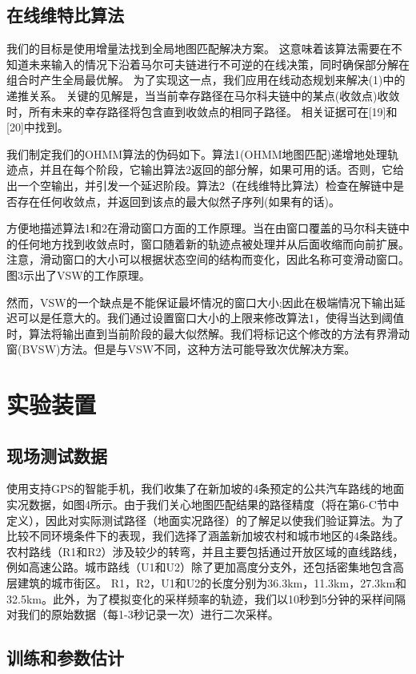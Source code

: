 \subsection{在线维特比算法}
我们的目标是使用增量法找到全局地图匹配解决方案。 这意味着该算法需要在不知道未来输入的情况下沿着马尔可夫链进行不可逆的在线决策，同时确保部分解在组合时产生全局最优解。 为了实现这一点，我们应用在线动态规划来解决(1)中的递推关系。 关键的见解是，当当前幸存路径在马尔科夫链中的某点(收敛点)收敛时，所有未来的幸存路径将包含直到收敛点的相同子路径。 相关证据可在[19]和[20]中找到。

我们制定我们的OHMM算法的伪码如下。算法1(OHMM地图匹配)递增地处理轨迹点，并且在每个阶段，它输出算法2返回的部分解，如果可用的话。否则，它给出一个空输出，并引发一个延迟阶段。算法2（在线维特比算法）检查在解链中是否存在任何收敛点，并返回到该点的最大似然子序列(如果有的话)。

方便地描述算法1和2在滑动窗口方面的工作原理。当在由窗口覆盖的马尔科夫链中的任何地方找到收敛点时，窗口随着新的轨迹点被处理并从后面收缩而向前扩展。注意，滑动窗口的大小可以根据状态空间的结构而变化，因此名称可变滑动窗口。图3示出了VSW的工作原理。

然而，VSW的一个缺点是不能保证最坏情况的窗口大小;因此在极端情况下输出延迟可以是任意大的。我们通过设置窗口大小的上限来修改算法1，使得当达到阈值时，算法将输出直到当前阶段的最大似然解。我们将标记这个修改的方法有界滑动窗(BVSW)方法。但是与VSW不同，这种方法可能导致次优解决方案。

\section{实验装置}

\subsection{现场测试数据}
使用支持GPS的智能手机，我们收集了在新加坡的4条预定的公共汽车路线的地面实况数据，如图4所示。由于我们关心地图匹配结果的路径精度（将在第6-C节中定义），因此对实际测试路径（地面实况路径）的了解足以使我们验证算法。为了比较不同环境条件下的表现，我们选择了涵盖新加坡农村和城市地区的4条路线。农村路线（R1和R2）涉及较少的转弯，并且主要包括通过开放区域的直线路线，例如高速公路。城市路线（U1和U2）除了更加高度分支外，还包括密集地包含高层建筑的城市街区。 R1，R2，U1和U2的长度分别为36.3km，11.3km，27.3km和32.5km。此外，为了模拟变化的采样频率的轨迹，我们以10秒到5分钟的采样间隔对我们的原始数据（每1-3秒记录一次）进行二次采样。

\subsection{训练和参数估计}


